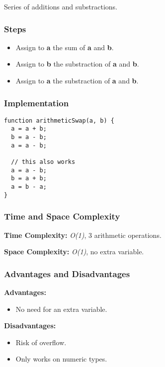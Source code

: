 Series of additions and substractions.

\subsubsection*{Steps}

\begin{itemize}
  \item Assign to \textbf{a} the sum of \textbf{a} and \textbf{b}.
  \item Assign to \textbf{b} the substraction of \textbf{a} and \textbf{b}.
  \item Assign to \textbf{a} the substraction of \textbf{a} and \textbf{b}.
\end{itemize}

\subsubsection*{Implementation}

\begin{lstlisting}[style=general]
function arithmeticSwap(a, b) {
  a = a + b;
  b = a - b;
  a = a - b;

  // this also works
  a = a - b;
  b = a + b;
  a = b - a;
}
\end{lstlisting}

\subsubsection*{Time and Space Complexity}

\textbf{Time Complexity:} \textit{O(1)}, 3 arithmetic operations.

\textbf{Space Complexity:} \textit{O(1)}, no extra variable.

\subsubsection*{Advantages and Disadvantages}

\textbf{Advantages:}

\begin{itemize}
  \item No need for an extra variable.
\end{itemize}

\textbf{Disadvantages:}

\begin{itemize}
  \item Risk of overflow.
  \item Only works on numeric types.
\end{itemize}
